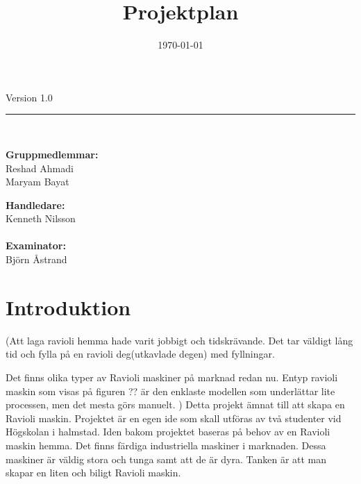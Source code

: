 \documentclass[a4paper]{article}
\title{Projektplan}
\date{\today}
\begin{document}
\maketitle

\begin{center}
\large{Version 1.0}   			%
\ \\[1cm]
\hrule
\ \\[1cm]
\begin{minipage}{0.5\textwidth}
	\begin{flushleft} \large
		\textbf{Gruppmedlemmar:} \\
		Reshad Ahmadi \\
		Maryam Bayat \\
		
		
	\end{flushleft}
\end{minipage}
\begin{minipage}{0.4\textwidth}
	\begin{flushright} \large
		\textbf{Handledare:} \\
		Kenneth Nilsson \\
		\ \\				
		\textbf{Examinator:} \\
		Björn Åstrand
	\end{flushright}
\end{minipage}
\end{center}

\clearpage

\tableofcontents
\newpage



\section{Introduktion} %
(Att laga ravioli hemma hade varit jobbigt och tidskrävande. Det tar väldigt lång tid och fylla på en ravioli deg(utkavlade degen) med fyllningar. 

Det finns olika typer av Ravioli maskiner på marknad redan nu. Entyp ravioli maskin som visas på figuren ?? är den enklaste modellen som underlättar lite processen, men det mesta görs manuelt. )
Detta projekt  ämnat till att skapa en Ravioli maskin. Projektet är en egen ide som skall utföras av två studenter vid Högskolan i halmstad.
Iden bakom projektet baseras på behov av en Ravioli maskin hemma.
Det finns färdiga industriella maskiner i marknaden. Dessa maskiner är väldig stora och tunga samt att de är dyra. 
Tanken är att man skapar en liten och biligt Ravioli maskin.
\end{document}

